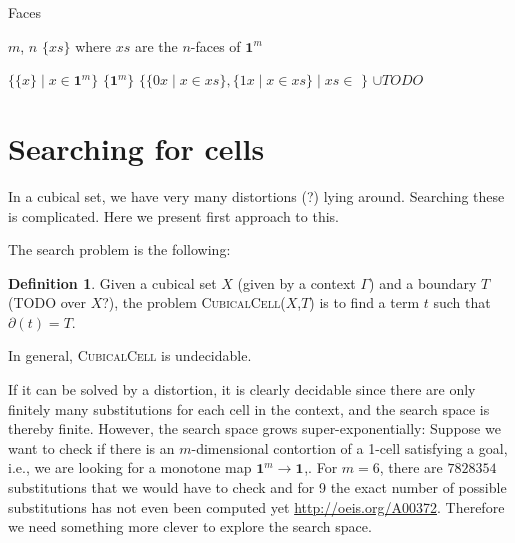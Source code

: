 \documentclass[11pt]{article}
\theoremstyle{definition}
\newtheorem{definition}{Definition}
\newcommand{\problem}[1]{\textsc{{#1}}}
\newcommand{\pint}[1]{\mathbf{1}^{#1}}
\newcommand{\boundary}[1]{\partial({#1})}
\begin{document}
\begin{algorithm}[H]
  \caption{Faces}\label{alg:wellformedcontext}
  \begin{algorithmic}
    \Require $m$, $n$
    \Ensure $\{ xs \}$ where $xs$ are the $n$-faces of $\pint{m}$

    \State $\{ \{ x \} \mid x \in \pint{m} \}$
    \State $\{ \pint{m} \}$
    \Else
    \State $\{ \{ 0x \mid x \in xs \} , \{ 1x \mid x \in xs\} \mid xs \in $  $ \}$
    \Statex $\cup TODO$
    \EndIf
    \EndProcedure
    
  \end{algorithmic}
\end{algorithm}


\section{Searching for cells}

In a cubical set, we have very many distortions (?) lying around. Searching
these is complicated. Here we present first approach to this.

The search problem is the following:

\begin{definition}
  Given a cubical set $X$ (given by a context $\Gamma$) and a boundary $T$ (TODO over $X$?), the problem
  \problem{CubicalCell}($X$,$T$) is to find a term $t$ such that $\boundary{t} = T$.
\end{definition}

In general, \problem{CubicalCell} is undecidable.

If it can be solved by a distortion, it is clearly decidable since there are
only finitely many substitutions for each cell in the context, and the search
space is thereby finite. However, the search space grows super-exponentially:
Suppose we want to check if there is an $m$-dimensional contortion of a 1-cell
satisfying a goal, i.e., we are looking for a monotone map $\pint{m} \to
\pint{}$,. For $m = 6$, there are $7828354$ substitutions that we would have to
check and for 9 the exact number of possible substitutions has not even been
computed yet \url{http://oeis.org/A00372}. Therefore we need something more
clever to explore the search space.
\end{document}
